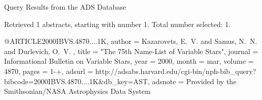 Query Results from the ADS Database


Retrieved 1 abstracts, starting with number 1.  Total number selected: 1.

@ARTICLE{2000IBVS.4870....1K,
   author = {{Kazarovets}, E.~V. and {Samus}, N.~N. and {Durlevich}, O.~V.
	},
    title = "{The 75th Name-List of Variable Stars}",
  journal = {Informational Bulletin on Variable Stars},
     year = 2000,
    month = mar,
   volume = 4870,
    pages = {1-+},
   adsurl = {http://adsabs.harvard.edu/cgi-bin/nph-bib_query?bibcode=2000IBVS.4870....1K&db_key=AST},
  adsnote = {Provided by the Smithsonian/NASA Astrophysics Data System}
}


